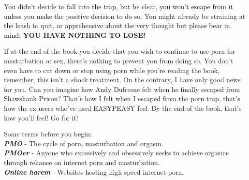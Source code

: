 \documentclass[easypeasy.tex]{subfiles}
\begin{document}
You didn't decide to fall into the trap, but be clear, you won't escape from it unless you make the positive decision to do so. You might already be straining at the leash to quit, or apprehensive about the very thought but please bear in mind: 
\textbf{YOU HAVE NOTHING TO LOSE!}

If at the end of the book you decide that you wish to continue to use porn for masturbation or sex, there's nothing to prevent you from doing so. You don't even have to cut down or stop using porn while you're reading the book, remember, this isn't a shock treatment. On the contrary, I have only good news for you. Can you imagine how Andy Dufresne felt when he finally escaped from Shawshank Prison? That's how I felt when I escaped from the porn trap, that's how the ex-users who've used EASYPEASY feel. By the end of the book, that's how you'll feel! Go for it!

Some terms before you begin:\\
{\small \textbf{\textit{PMO}} - The cycle of porn, masturbation and orgasm.\\
  \textbf{\textit{PMOer}} - Anyone who excessively and obsessively seeks to achieve orgasms through reliance on internet porn and masturbation.\\
  \textbf{\textit{Online harem}} - Websites hosting high speed internet porn.
  }
\end{document}
